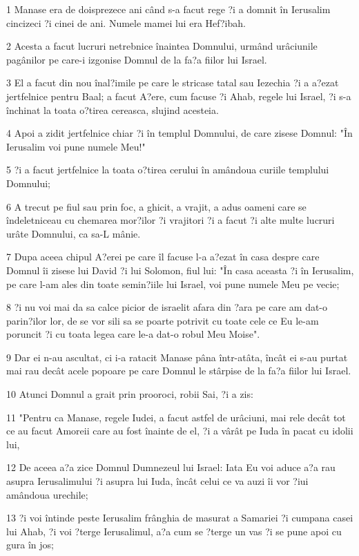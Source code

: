 \par 1 Manase era de doisprezece ani când s-a facut rege ?i a domnit în Ierusalim cincizeci ?i cinei de ani. Numele mamei lui era Hef?ibah.
\par 2 Acesta a facut lucruri netrebnice înaintea Domnului, urmând urâciunile pagânilor pe care-i izgonise Domnul de la fa?a fiilor lui Israel.
\par 3 El a facut din nou înal?imile pe care le stricase tatal sau Iezechia ?i a a?ezat jertfelnice pentru Baal; a facut A?ere, cum facuse ?i Ahab, regele lui Israel, ?i s-a închinat la toata o?tirea cereasca, slujind acesteia.
\par 4 Apoi a zidit jertfelnice chiar ?i în templul Domnului, de care zisese Domnul: "În Ierusalim voi pune numele Meu!"
\par 5 ?i a facut jertfelnice la toata o?tirea cerului în amândoua curiile templului Domnului;
\par 6 A trecut pe fiul sau prin foc, a ghicit, a vrajit, a adus oameni care se îndeletniceau cu chemarea mor?ilor ?i vrajitori ?i a facut ?i alte multe lucruri urâte Domnului, ca sa-L mânie.
\par 7 Dupa aceea chipul A?erei pe care îl facuse l-a a?ezat în casa despre care Domnul îi zisese lui David ?i lui Solomon, fiul lui: "În casa aceasta ?i în Ierusalim, pe care l-am ales din toate semin?iile lui Israel, voi pune numele Meu pe vecie;
\par 8 ?i nu voi mai da sa calce picior de israelit afara din ?ara pe care am dat-o parin?ilor lor, de se vor sili sa se poarte potrivit cu toate cele ce Eu le-am poruncit ?i cu toata legea care le-a dat-o robul Meu Moise".
\par 9 Dar ei n-au ascultat, ci i-a ratacit Manase pâna într-atâta, încât ei s-au purtat mai rau decât acele popoare pe care Domnul le stârpise de la fa?a fiilor lui Israel.
\par 10 Atunci Domnul a grait prin prooroci, robii Sai, ?i a zis:
\par 11 "Pentru ca Manase, regele Iudei, a facut astfel de urâciuni, mai rele decât tot ce au facut Amoreii care au fost înainte de el, ?i a vârât pe Iuda în pacat cu idolii lui,
\par 12 De aceea a?a zice Domnul Dumnezeul lui Israel: Iata Eu voi aduce a?a rau asupra Ierusalimului ?i asupra lui Iuda, încât celui ce va auzi îi vor ?iui amândoua urechile;
\par 13 ?i voi întinde peste Ierusalim frânghia de masurat a Samariei ?i cumpana casei lui Ahab, ?i voi ?terge Ierusalimul, a?a cum se ?terge un vas ?i se pune apoi cu gura în jos;
